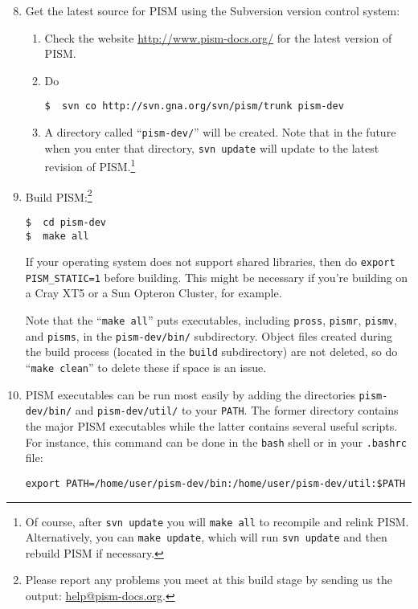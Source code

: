 \documentclass[11pt,final]{amsart}
\renewcommand{\t}[1]{\texttt{#1}}
\begin{document}
\begin{enumerate}\setcounter{enumi}{7}
\item Get the latest source for PISM using the Subversion version control system:
\begin{enumerate}
\item \label{getPISMstep} Check the website \url{http://www.pism-docs.org/} for the latest version of PISM.
\item Do
\begin{verbatim}
$  svn co http://svn.gna.org/svn/pism/trunk pism-dev
\end{verbatim}
\item A directory called ``\texttt{pism-dev/}'' will be created.  Note that in the future when you enter that directory, \texttt{svn update} will update to the latest revision of PISM.\footnote{Of course, after \t{svn update} you will \t{make all} to recompile and relink PISM. Alternatively, you can \t{make update}, which will run \t{svn update} and then rebuild PISM if necessary.}
\end{enumerate}

\item Build PISM:\footnote{Please report any problems you meet at this build stage by sending us the output: \href{mailto:help@pism-docs.org}{help@pism-docs.org}.}
\begin{verbatim}
$  cd pism-dev
$  make all
\end{verbatim}

If your operating system does not support shared libraries, then do \texttt{export PISM_STATIC=1} before building.  This might be necessary if you're building on a Cray XT5 or a Sun Opteron Cluster, for example.

Note that the ``\texttt{make all}'' puts executables, including \texttt{pross}, \texttt{pismr}, \texttt{pismv}, and \texttt{pisms}, in the \texttt{pism-dev/bin/} subdirectory.  Object files created during the build process (located in the \texttt{build} subdirectory) are not deleted, so do ``\texttt{make clean}'' to delete these if space is an issue.

\item PISM executables can be run most easily by adding the directories \texttt{pism-dev/bin/} and \texttt{pism-dev/util/} to your \texttt{PATH}.  The former directory contains the major PISM executables while the latter contains several useful scripts.  For instance, this command can be done in the \texttt{bash} shell or in your \texttt{.bashrc} file:
\begin{verbatim}
export PATH=/home/user/pism-dev/bin:/home/user/pism-dev/util:$PATH
\end{verbatim}
\end{enumerate}
\end{document}
